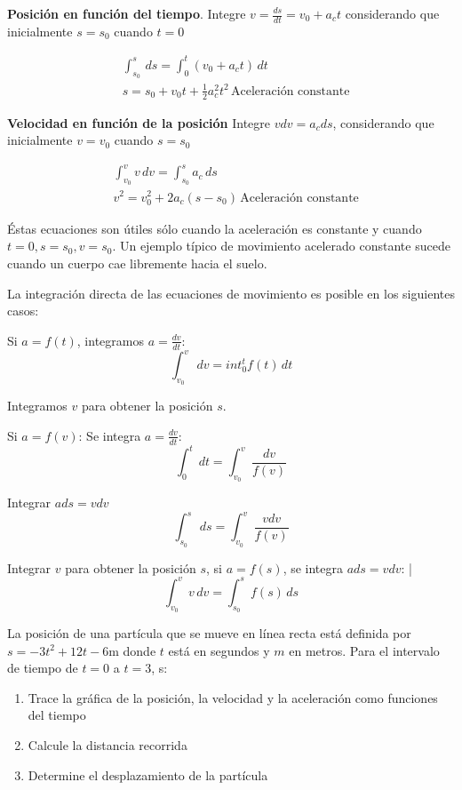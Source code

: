 \textbf{Posición en función del tiempo}. Integre $v=\frac{ds}{dt}=v_0+a_ct$
considerando que inicialmente $s=s_0$ cuando $t=0$

\begin{align}
    &\int_{s_0}^{s}\, ds=\int_0^t \left(v_0+a_ct\right)\, dt\\
    &s=s_0+v_0t+\frac{1}{2}a_c^2t^2\, \text{Aceleración constante}
\end{align}

\textbf{Velocidad en función de la posición} Integre $vdv=a_cds$, considerando que inicialmente $v=v_0$ cuando $s=s_0$

\begin{align}
    &\int_{v_0}^{v} v\, dv=\int_{s_0}^s a_c\, ds\\
    &v^2=v_0^2+2a_c\left(s-s_0\right)\, \text{Aceleración constante}
\end{align}

Éstas ecuaciones son útiles sólo cuando la aceleración es constante y cuando $t=0,s=s_0,v=s_0$. Un ejemplo típico de movimiento acelerado constante sucede cuando un cuerpo cae libremente hacia el suelo. 

La integración directa de las ecuaciones de movimiento es posible en los siguientes casos: 

Si $a=f(t)$, integramos $a=\frac{dv}{dt}$:
\begin{equation*}
\int_{v_0}^v\,dv=int_0^t f(t)\, dt
\end{equation*}

Integramos $v$ para obtener la posición $s$.

Si $a=f(v)$: Se integra $a=\frac{dv}{dt}$: 
\begin{equation*}
    \int_0^t \, dt=\int_{v_0}^v\frac{dv}{f(v)}
\end{equation*}

Integrar $ads=vdv$
\begin{equation*}
    \int_{s_0}^s\, ds=\int_{v_0}^v\frac{vdv}{f(v)}
\end{equation*}

Integrar $v$ para obtener la posición $s$, si $a=f(s)$, se integra $ads=vdv$: |
\begin{equation*}
    \int_{v_0}^v v\, dv=\int_{s_0}^s f(s)\, ds
\end{equation*}

\begin{example}
    La posición de una partícula que se mueve en línea recta está definida por $s=-3t^2+12t-6$m donde $t$ está en segundos y $m$ en metros. Para el intervalo de tiempo de $t=0$ a $t=3$, s:
    \begin{enumerate}
        \item Trace la gráfica de la posición, la velocidad y la aceleración como funciones del tiempo
        \item Calcule la distancia recorrida
        \item Determine el desplazamiento de la partícula 
    \end{enumerate}
\end{example}

